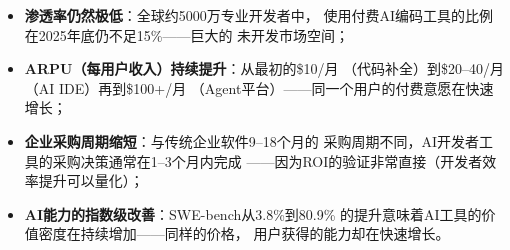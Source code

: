 \begin{itemize}
  \item \textbf{渗透率仍然极低}：全球约5000万专业开发者中，
    使用付费AI编码工具的比例在2025年底仍不足15\%——巨大的
    未开发市场空间；
  \item \textbf{ARPU（每用户收入）持续提升}：从最初的\$10/月
    （代码补全）到\$20--40/月（AI IDE）再到\$100+/月
    （Agent平台）——同一个用户的付费意愿在快速增长；
  \item \textbf{企业采购周期缩短}：与传统企业软件9--18个月的
    采购周期不同，AI开发者工具的采购决策通常在1--3个月内完成
    ——因为ROI的验证非常直接（开发者效率提升可以量化）；
  \item \textbf{AI能力的指数级改善}：SWE-bench从3.8\%到80.9\%
    的提升意味着AI工具的价值密度在持续增加——同样的价格，
    用户获得的能力却在快速增长。
\end{itemize}


